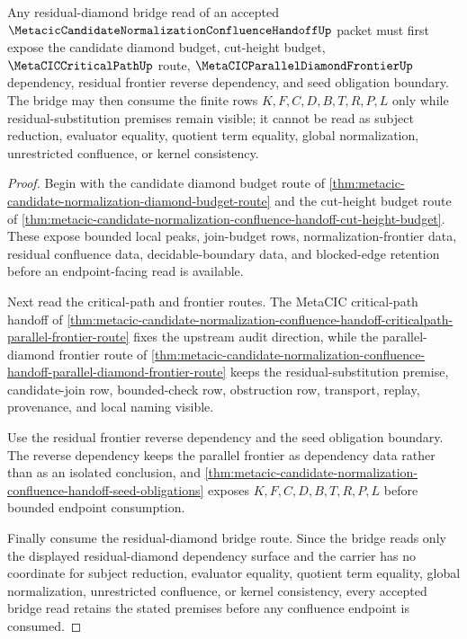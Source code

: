 \begin{theorem}
\label{thm:metacic-candidate-normalization-parallel-frontier-residual-bridge-consumption}
Any residual-diamond bridge read of an accepted $\MetacicCandidateNormalizationConfluenceHandoffUp$ packet must first expose the candidate diamond budget, cut-height budget, $\MetaCICCriticalPathUp$ route, $\MetaCICParallelDiamondFrontierUp$ dependency, residual frontier reverse dependency, and seed obligation boundary. The bridge may then consume the finite rows $K,F,C,D,B,T,R,P,L$ only while residual-substitution premises remain visible; it cannot be read as subject reduction, evaluator equality, quotient term equality, global normalization, unrestricted confluence, or kernel consistency.
\end{theorem}
\begin{proof}
Begin with the candidate diamond budget route of \autoref{thm:metacic-candidate-normalization-diamond-budget-route} and the cut-height budget route of \autoref{thm:metacic-candidate-normalization-confluence-handoff-cut-height-budget}. These expose bounded local peaks, join-budget rows, normalization-frontier data, residual confluence data, decidable-boundary data, and blocked-edge retention before an endpoint-facing read is available.

Next read the critical-path and frontier routes. The MetaCIC critical-path handoff of \autoref{thm:metacic-candidate-normalization-confluence-handoff-criticalpath-parallel-frontier-route} fixes the upstream audit direction, while the parallel-diamond frontier route of \autoref{thm:metacic-candidate-normalization-confluence-handoff-parallel-diamond-frontier-route} keeps the residual-substitution premise, candidate-join row, bounded-check row, obstruction row, transport, replay, provenance, and local naming visible.

Use the residual frontier reverse dependency and the seed obligation boundary. The reverse dependency keeps the parallel frontier as dependency data rather than as an isolated conclusion, and \autoref{thm:metacic-candidate-normalization-confluence-handoff-seed-obligations} exposes $K,F,C,D,B,T,R,P,L$ before bounded endpoint consumption.

Finally consume the residual-diamond bridge route. Since the bridge reads only the displayed residual-diamond dependency surface and the carrier has no coordinate for subject reduction, evaluator equality, quotient term equality, global normalization, unrestricted confluence, or kernel consistency, every accepted bridge read retains the stated premises before any confluence endpoint is consumed.
\end{proof}
